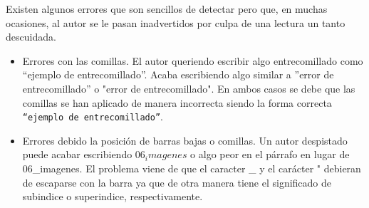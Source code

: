 Existen algunos errores que son sencillos de detectar pero que, en muchas ocasiones, 
al autor se le pasan inadvertidos por culpa de una lectura un tanto descuidada. 

\begin{itemize}
    \item Errores con las comillas. El autor queriendo escribir algo entrecomillado 
    como ``ejemplo de entrecomillado''. Acaba escribiendo algo similar a ''error 
    de entrecomillado'' o "error de entrecomillado". En ambos casos se debe que las 
    comillas se han aplicado de manera incorrecta siendo la forma correcta 
    \texttt{``ejemplo de entrecomillado''}.
    \item Errores debido la posición de barras bajas o comillas. Un autor despistado 
    puede acabar escribiendo $06_imagenes$ o algo peor en el párrafo en lugar de 
    06\_imagenes. El problema  viene de que el caracter \_ y el carácter " debieran 
    de escaparse con la barra ya que de otra manera tiene el significado de subindice 
    o superindice, respectivamente.
\end{itemize}